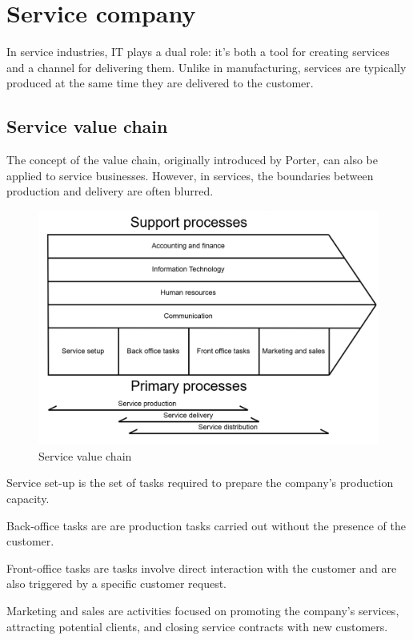 \section{Service company}

In service industries, IT plays a dual role: it's both a tool for creating services and a channel for delivering them. 
Unlike in manufacturing, services are typically produced at the same time they are delivered to the customer.

\subsection{Service value chain}
The concept of the value chain, originally introduced by Porter, can also be applied to service businesses. 
However, in services, the boundaries between production and delivery are often blurred.
\begin{figure}[H]
    \centering
    \includegraphics[width=0.75\linewidth]{images/bis13.png}
    \caption{Service value chain}
\end{figure}

\begin{definition}
    Service set-up is the set of tasks required to prepare the company's production capacity.
\end{definition}
\begin{definition}
    Back-office tasks are are production tasks carried out without the presence of the customer.
\end{definition}
\begin{definition}
    Front-office tasks are tasks involve direct interaction with the customer and are also triggered by a specific customer request.
\end{definition}
\begin{definition}
    Marketing and sales are activities focused on promoting the company's services, attracting potential clients, and closing service contracts with new customers.
\end{definition}


